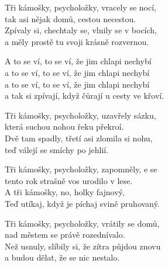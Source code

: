 
\ve{}
Tři kámošky, psycholožky, vracely se nocí,\\
tak asi nějak domů, cestou necestou.\\
Zpívaly si, chechtaly se, vlnily se v bocích,\\
a měly prostě tu svoji krásně rozvernou.

\cho{}
A to se ví, to se ví, že jim chlapi nechybí\\
a to se ví, to se ví, že jim chlapi nechybí\\
a to se ví, to se ví, že jim chlapi nechybí\\
a tak si zpívají, když čůrají u cesty ve křoví.

\ve{}
Tři kámošky, psycholožky, uzavřely sázku,\\
která suchou nohou řeku překroí.\\
Dvě tam spadly, třetí asi zlomila si nohu,\\
teď válejí se smíchy po jehlií. 

\cho{}

\ve{}
Tři kámošky, psycholožky, zapomněly, e se\\
tento rok strašně vos urodilo v lese.\\
A tři kámošky, no, holky fajnový,\\
Teď utíkaj, když je píchaj svině pruhovaný.

\cho{}

\ve{}
Tři kámošky, psycholožky, vrátily se domů,\\
nad městem se právě rozednívalo.\\
Než usnuly, slíbily si, že zítra půjdou znovu\\
a budou dělat, že se nic nestalo.

\cho{}
\esong{}